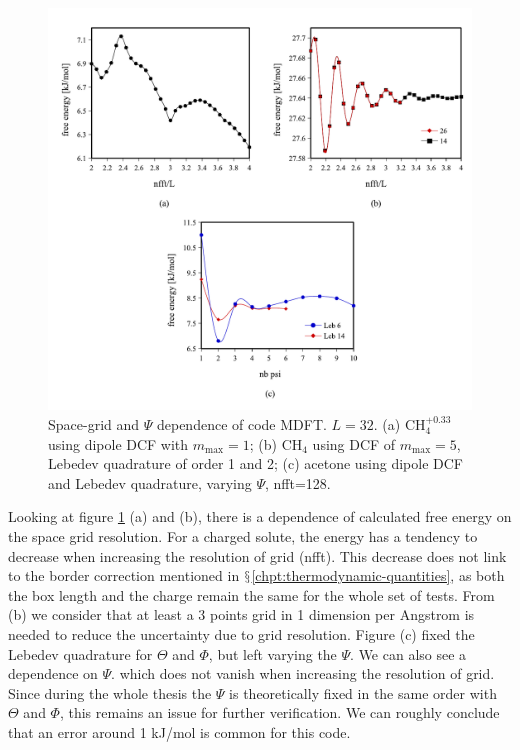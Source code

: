 \begin{figure}[H]
\begin{centering}
\includegraphics[bb=0bp 20bp 567bp 519bp,width=0.75\columnwidth]{_figure/results/grid_reso}
\par\end{centering}
\caption[Space-grid and $\Psi$ dependence of code MDFT]{Space-grid and $\Psi$ dependence of code MDFT. $L=32$. (a) $\mathrm{CH_{4}^{+0.33}}$
using dipole DCF with $m_{\max}=1$; (b) $\mathrm{CH_{4}}$ using
DCF of $m_{\max}=5$, Lebedev quadrature of order 1 and 2; (c) acetone
using dipole DCF and Lebedev quadrature, varying $\Psi$, nfft=128.
\label{fig:Space-grid-and-psi-dependence}}
\end{figure}

Looking at figure \ref{fig:Space-grid-and-psi-dependence} (a) and
(b), there is a dependence of calculated free energy on the space
grid resolution. For a charged solute, the energy has a tendency to
decrease when increasing the resolution of grid (nfft). This decrease
does not link to the border correction mentioned in $\mathsection$\ref{chpt:thermodynamic-quantities},
as both the box length and the charge remain the same for the whole set
of tests. From (b) we consider that at least a 3 points grid in 1 dimension
per Angstrom is needed to reduce the uncertainty due to grid resolution.
Figure (c) fixed the Lebedev quadrature for $\Theta$ and $\Phi$,
but left varying the $\Psi$. We can also see a dependence on $\Psi$.
which does not vanish when increasing the resolution of grid. Since during
the whole thesis the $\Psi$ is theoretically fixed in the same order
with $\Theta$ and $\Phi$, this remains an issue for further verification.
We can roughly conclude that an error around 1 kJ/mol is common for
this code.


